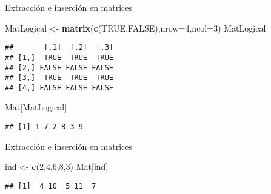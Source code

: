 \documentclass[ignorenonframetext,]{beamer}
\newenvironment{Shaded}{\begin{snugshade}}{\end{snugshade}}
\newcommand{\KeywordTok}[1]{\textcolor[rgb]{0.13,0.29,0.53}{\textbf{#1}}}
\newcommand{\DataTypeTok}[1]{\textcolor[rgb]{0.13,0.29,0.53}{#1}}
\newcommand{\DecValTok}[1]{\textcolor[rgb]{0.00,0.00,0.81}{#1}}
\newcommand{\StringTok}[1]{\textcolor[rgb]{0.31,0.60,0.02}{#1}}
\newcommand{\OtherTok}[1]{\textcolor[rgb]{0.56,0.35,0.01}{#1}}
\newcommand{\NormalTok}[1]{#1}
\begin{document}
\begin{frame}[fragile]{Extracción e inserción en matrices}

\begin{Shaded}
\begin{Highlighting}[]
\NormalTok{MatLogical <-}\StringTok{ }\KeywordTok{matrix}\NormalTok{(}\KeywordTok{c}\NormalTok{(}\OtherTok{TRUE}\NormalTok{,}\OtherTok{FALSE}\NormalTok{),}\DataTypeTok{nrow=}\DecValTok{4}\NormalTok{,}\DataTypeTok{ncol=}\DecValTok{3}\NormalTok{)}
\NormalTok{MatLogical}
\end{Highlighting}
\end{Shaded}
\pause
\begin{verbatim}
##       [,1]  [,2]  [,3]
## [1,]  TRUE  TRUE  TRUE
## [2,] FALSE FALSE FALSE
## [3,]  TRUE  TRUE  TRUE
## [4,] FALSE FALSE FALSE
\end{verbatim}

\begin{Shaded}
\begin{Highlighting}[]
\NormalTok{Mat[MatLogical]}
\end{Highlighting}
\end{Shaded}
\pause
\begin{verbatim}
## [1] 1 7 2 8 3 9
\end{verbatim}

\end{frame}

\begin{frame}[fragile]{Extracción e inserción en matrices}

\begin{Shaded}
\begin{Highlighting}[]
\NormalTok{ind <-}\StringTok{ }\KeywordTok{c}\NormalTok{(}\DecValTok{2}\NormalTok{,}\DecValTok{4}\NormalTok{,}\DecValTok{6}\NormalTok{,}\DecValTok{8}\NormalTok{,}\DecValTok{3}\NormalTok{)}
\NormalTok{Mat[ind]}
\end{Highlighting}
\end{Shaded}
\pause
\begin{verbatim}
## [1]  4 10  5 11  7
\end{verbatim}

\end{frame}
\end{document}

